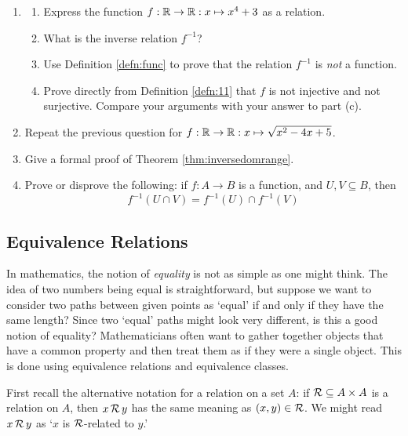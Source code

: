 \begin{exercises}{}{}
\begin{enumerate}
  \item\begin{enumerate}
    \item Express the function $f:\mathbb{R}\to\mathbb{R}:x\mapsto x^4+3$ as a relation.
    \item What is the inverse relation $f^{-1}$?
    \item Use Definition \ref{defn:func} to prove that the relation $f^{-1}$ is \emph{not} a function.
    \item Prove directly from Definition \ref{defn:11} that $f$ is not injective and not surjective. Compare your arguments with your answer to part (c).
  \end{enumerate}
  
  \item Repeat the previous question for $f:\mathbb{R}\to\mathbb{R}:x\mapsto \sqrt{x^2-4x+5}$.
  
  \item Give a formal proof of Theorem \ref{thm:inversedomrange}.
  
  \item Prove or disprove the following: if $f:A\to B$ is a function, and $U,V\subseteq B$, then
  \[f^{-1}(U\cap V)=f^{-1}(U)\cap f^{-1}(V)\]
\end{enumerate}

\end{exercises}

\clearpage



\subsection{Equivalence Relations}\label{sec:equiv}

In mathematics, the notion of \emph{equality} is not as simple as one might think. The idea of two numbers being equal is straightforward, but suppose we want to consider two paths between given points as `equal' if and only if they have the same length? Since two `equal' paths might look very different, is this a good notion of equality? Mathematicians often want to gather together objects that have a common property and then treat them as if they were a single object. This is done using equivalence relations and equivalence classes.\par

First recall the alternative notation for a relation on a set $A$: if $\mathcal{R}\subseteq A\times A$ is a relation on $A$, then $x\,\mathcal{R}\,y$ has the same meaning as $(x,y)\in\mathcal{R}$. We might read $x\,\mathcal{R}\,y$ as `$x$ is $\mathcal{R}$-related to $y$.'

